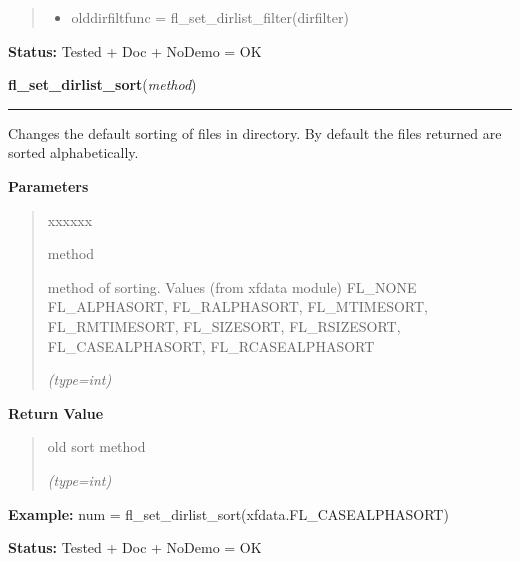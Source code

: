 \begin{boxedminipage}{\funcwidth}
\begin{quote}
\begin{itemize}
  \item olddirfiltfunc = fl\_set\_dirlist\_filter(dirfilter)



\end{itemize}

\end{quote}

\textbf{Status:} Tested + Doc + NoDemo = OK



    \end{boxedminipage}

    \label{xformslib:flfilesys:fl_set_dirlist_sort}

    \vspace{0.5ex}

\hspace{.8\funcindent}\begin{boxedminipage}{\funcwidth}

    \raggedright \textbf{fl\_set\_dirlist\_sort}(\textit{method})

    \vspace{-1.5ex}

    \rule{\textwidth}{0.5\fboxrule}
\setlength{\parskip}{2ex}
    Changes the default sorting of files in directory. By default the files
    returned are sorted alphabetically.

\setlength{\parskip}{1ex}
      \textbf{Parameters}
      \vspace{-1ex}

      \begin{quote}
        \begin{Ventry}{xxxxxx}

          \item[method]

          method of sorting. Values (from xfdata module) FL\_NONE 
          FL\_ALPHASORT, FL\_RALPHASORT, FL\_MTIMESORT, FL\_RMTIMESORT, 
          FL\_SIZESORT, FL\_RSIZESORT, FL\_CASEALPHASORT, 
          FL\_RCASEALPHASORT

            {\it (type=int)}

        \end{Ventry}

      \end{quote}

      \textbf{Return Value}
    \vspace{-1ex}

      \begin{quote}
      old sort method

      {\it (type=int)}

      \end{quote}

\textbf{Example:} num = fl\_set\_dirlist\_sort(xfdata.FL\_CASEALPHASORT)



\textbf{Status:} Tested + Doc + NoDemo = OK



    \end{boxedminipage}

